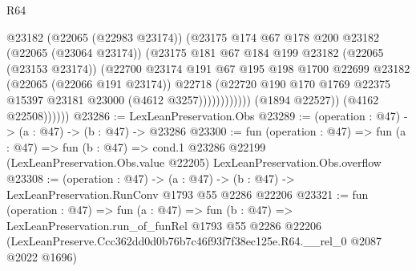 \begin{lexlean}{R64}
\begin{coremodule}
                              @23182
                              (@22065 (@22983 @23174))
                              (@23175
                                @174
                                @67
                                @178
                                @200
                                @23182
                                (@22065 (@23064 @23174))
                                (@23175
                                  @181
                                  @67
                                  @184
                                  @199
                                  @23182
                                  (@22065 (@23153 @23174))
                                  (@22700
                                    @23174
                                    @191
                                    @67
                                    @195
                                    @198
                                    @1700
                                    @22699
                                    @23182
                                    (@22065 (@22066 @191 @23174))
                                    @22718
                                    (@22720
                                      @190
                                      @170
                                      @1769
                                      @22375
                                      @15397
                                      @23181
                                      @23000
                                      (@4612 @3257))))))))))))
                (@1894 @22527))
              (@4162 @22508))))))
@23286 := LexLeanPreservation.Obs
@23289 := (operation : @47) -> (a : @47) -> (b : @47) -> @23286
@23300 := fun (operation : @47) =>
  fun (a : @47) =>
  fun (b : @47) =>
  cond.{1} @23286 @22199 (LexLeanPreservation.Obs.value @22205) LexLeanPreservation.Obs.overflow
@23308 := (operation : @47) ->
  (a : @47) -> (b : @47) -> LexLeanPreservation.RunConv @1793 @55 @2286 @22206
@23321 := fun (operation : @47) =>
  fun (a : @47) =>
  fun (b : @47) =>
  LexLeanPreservation.run_of_funRel
    @1793
    @55
    @2286
    @22206
    (LexLeanPreserve.Ccc362dd0d0b76b7c46f93f7f38ec125e.R64.__rel_0 @2087 @2022 @1696)
\end{coremodule}
\end{lexlean}
